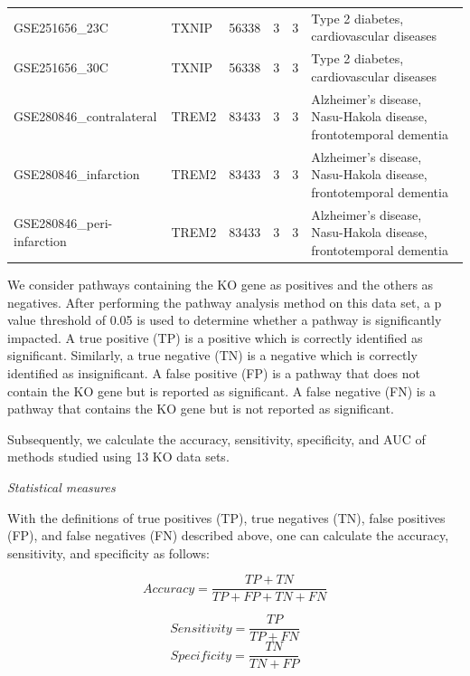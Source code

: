 \begin{landscape}
\begin{longtable}{@{}llcccl@{}}
GSE251656\_23C		    	&TXNIP		&56338	&3	&3	&Type 2 diabetes, cardiovascular diseases \\	
GSE251656\_30C			&TXNIP		&56338	&3	&3	&Type 2 diabetes, cardiovascular diseases\\	
GSE280846\_contralateral	&TREM2		&83433	&3	&3	&Alzheimer’s disease,  Nasu-Hakola disease, frontotemporal dementia\\	
GSE280846\_infarction		&TREM2		&83433	&3	&3	&Alzheimer’s disease,  Nasu-Hakola disease, frontotemporal dementia \\	
GSE280846\_peri-infarction	&TREM2		&83433	&3	&3	&Alzheimer’s disease,  Nasu-Hakola disease, frontotemporal dementia\\	
\hline
 \end{longtable}
\end{landscape}

We consider pathways containing the KO gene as positives and the others as negatives. After performing the pathway analysis method on this data set, a p value threshold of 0.05 is used to determine whether a pathway is significantly impacted. A true positive (TP) is a positive which is correctly identified as significant. 
Similarly, a true negative (TN) is a negative which is correctly identified as insignificant.
A false positive (FP) is a pathway that does not contain the KO gene but is reported as significant. A false negative (FN) is a pathway that contains the KO gene but is not reported as significant.

Subsequently, we calculate the accuracy, sensitivity, specificity, and AUC of methods studied using 13 KO data sets.

\textit{Statistical measures} 

With the definitions of true positives (TP), true negatives (TN), false positives (FP), and false negatives (FN) described above, one can calculate the accuracy, sensitivity, and specificity as follows:

\begin{equation}
Accuracy = \frac{TP + TN}{TP + FP + TN + FN}
\end{equation}

\begin{equation}
Sensitivity = \frac{TP}{TP + FN}
\end{equation}
\begin{equation}
Specificity = \frac{TN}{TN + FP}
\end{equation}


